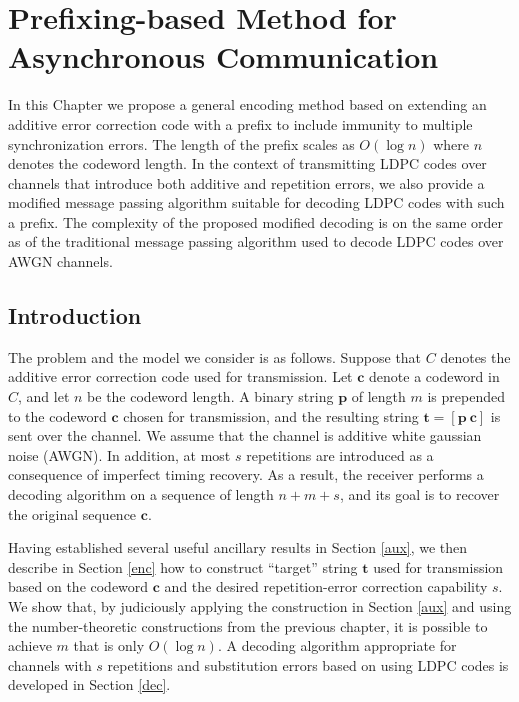 \chapter[Prefixing-based Method for Asynchronous Communication]{Prefixing-based Method for Asynchronous
Communication}\label{prefixing}

In this Chapter  we propose a general encoding method based on
extending an additive error correction code with a prefix to
include immunity to multiple synchronization errors. The length of
the prefix scales as $O(\log n)$ where $n$ denotes the codeword
length. In the context of transmitting LDPC codes over channels
that introduce both additive and repetition errors, we also
provide a modified message passing algorithm suitable for decoding
LDPC codes with such a prefix. The complexity of the proposed
modified decoding is on the same order as of the traditional
message passing algorithm used to decode LDPC codes over AWGN
channels.

\section{Introduction}

The problem and the model we consider is as follows. Suppose that
$C$ denotes the additive error correction code used for
transmission. Let $\mathbf{c}$ denote a codeword in $C$, and let
$n$ be the codeword length. A binary string $\mathbf{p}$ of length
$m$ is prepended to the codeword $\mathbf{c}$ chosen for
transmission, and the resulting string $\mathbf{t}=[\mathbf{p}~
\mathbf{c}]$ is sent over the channel. We assume that the channel
is additive white gaussian noise (AWGN). In addition, at most $s$
repetitions are introduced as a consequence of imperfect timing
recovery. As a result, the receiver performs a decoding algorithm
on a sequence of length $n+m+s$, and its goal is to recover the
original sequence $\mathbf{c}$.


Having established several useful ancillary results in Section
\ref{aux}, we then describe in Section \ref{enc} how to construct
``target'' string $\mathbf{t}$ used for transmission based on the
codeword $\mathbf{c}$ and the desired repetition-error correction
capability $s$. We show that, by judiciously applying the
construction in Section \ref{aux} and using the number-theoretic
constructions from the previous chapter, it is possible to achieve
$m$ that is only $O(\log n)$. A decoding algorithm appropriate for
channels with $s$ repetitions and substitution errors based on
using LDPC codes is developed in Section \ref{dec}.

